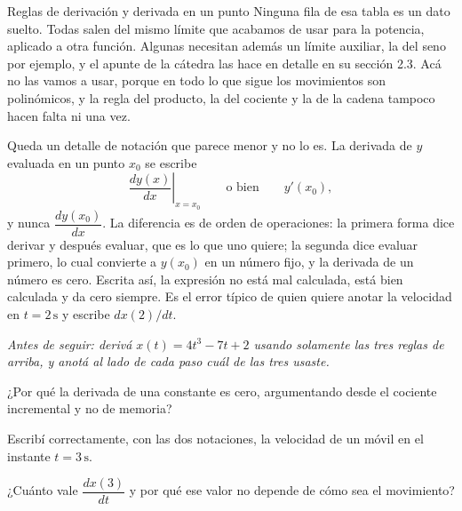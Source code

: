 \documentclass[11pt,openany]{book}
\begin{document}
\begin{bloque}{Reglas de derivación y derivada en un punto}
Ninguna fila de esa tabla es un dato suelto. Todas salen del mismo límite que acabamos de usar para la potencia, aplicado a otra función. Algunas necesitan además un límite auxiliar, la del seno por ejemplo, y el apunte de la cátedra las hace en detalle en su sección 2.3. Acá no las vamos a usar, porque en todo lo que sigue los movimientos son polinómicos, y la regla del producto, la del cociente y la de la cadena tampoco hacen falta ni una vez.

Queda un detalle de notación que parece menor y no lo es. La derivada de $y$ evaluada en un punto $x_0$ se escribe
\[
\left.\frac{dy(x)}{dx}\right\rvert_{x=x_0} \qquad\text{o bien}\qquad y'(x_0),
\]
y nunca $\dfrac{dy(x_0)}{dx}$. La diferencia es de orden de operaciones: la primera forma dice derivar y después evaluar, que es lo que uno quiere; la segunda dice evaluar primero, lo cual convierte a $y(x_0)$ en un número fijo, y la derivada de un número es cero. Escrita así, la expresión no está mal calculada, está bien calculada y da cero siempre. Es el error típico de quien quiere anotar la velocidad en $t=2\,\mathrm{s}$ y escribe $dx(2)/dt$.

\textit{Antes de seguir: derivá $x(t) = 4t^3 - 7t + 2$ usando solamente las tres reglas de arriba, y anotá al lado de cada paso cuál de las tres usaste.}
\end{bloque}

\begin{chequeo}
\item ¿Por qué la derivada de una constante es cero, argumentando desde el cociente incremental y no de memoria?
\item Escribí correctamente, con las dos notaciones, la velocidad de un móvil en el instante $t=3\,\mathrm{s}$.
\item ¿Cuánto vale $\dfrac{dx(3)}{dt}$ y por qué ese valor no depende de cómo sea el movimiento?
\end{chequeo}
\end{document}
